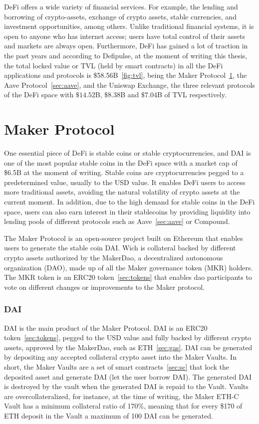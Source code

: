 \documentclass[11pt,a4paper]{report}
\begin{document}
DeFi offers a wide variety of financial services. For example, the lending and borrowing of crypto-assets, exchange of crypto assets, stable currencies, and investment opportunities, among others. Unlike traditional financial systems, it is open to anyone who has internet access; users have total control of their assets and markets are always open. Furthermore, DeFi has gained a lot of traction in the past years and according to Defipulse\cite{defipulse}, at the moment of writing this thesis, the total locked value or TVL (held by smart contracts) in all the DeFi applications and protocols is \$58.56B~\ref{fig:tvl}, being the Maker Protocol~\ref{sec:maker}, the Aave Protocol~\ref{sec:aave}, and the Uniswap Exchange\cite{uniswap}, the three relevant protocols of the DeFi space with $\$14.52$B, $\$8.38$B and $\$7.04$B of TVL respectively. 
\section{Maker Protocol}\label{sec:maker}
One essential piece of DeFi is stable coins or stable cryptocurrencies, and DAI is one of the most popular stable coins in the DeFi space with a market cap of \$6.5B\cite{stablecoinsmarket} at the moment of writing. Stable coins are cryptocurrencies pegged to a predetermined value, usually to the USD value. It enables DeFi users to access more traditional assets, avoiding the natural volatility of crypto assets at the current moment. In addition, due to the high demand for stable coins in the DeFi space, users can also earn interest in their stablecoins by providing liquidity into lending pools of different protocols such as Aave~\ref{sec:aave} or Compound\cite{compound}.

The Maker Protocol\cite{maker} is an open-source project built on Ethereum that enables users to generate the stable coin DAI. Wich is collateral backed by different crypto assets authorized by the MakerDao, a decentralized autonomous organization (DAO)\cite{wiki:Dao}, made up of all the Maker governance token (MKR) holders. The MKR token is an ERC20 token~\ref{sec:tokens} that enables dao participants to vote on different changes or improvements to the Maker protocol.
\subsubsection{DAI}\label{sec:dai}
DAI\cite{makerDAI} is the main product of the Maker Protocol. DAI is an ERC20 token~\ref{sec:tokens},  pegged to the USD value and fully backed by different crypto assets, approved by the MakerDao, such as ETH~\ref{sec:gas}. DAI can be generated by depositing any accepted collateral crypto asset into the Maker Vaults. In short, the Maker Vaults are a set of smart contracts~\ref{sec:sc} that lock the deposited asset and generate DAI (let the user borrow DAI). The generated DAI is destroyed by the vault when the generated DAI is repaid to the Vault. Vaults are overcollateralized, for instance, at the time of writing, the Maker ETH-C Vault has a minimum collateral ratio of 170\%\cite{oasisapp}, meaning that for every \$170 of ETH deposit in the Vault a maximum of 100 DAI can be generated.
\end{document}
